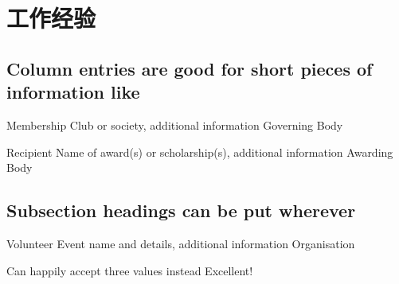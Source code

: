 \section{\kaishu 工作经验}

\subsection{Column entries are good for short pieces of information like}

      {Membership}
    {Club or society, additional information}
    {Governing Body}

      {Recipient}
      {Name of award(s) or scholarship(s), additional information}
      {Awarding Body}

\subsection{Subsection headings can be put wherever}

    {Volunteer}
    {Event name and details, additional information}
    {Organisation}
    
    {Can happily accept three values instead}
    {Excellent!}